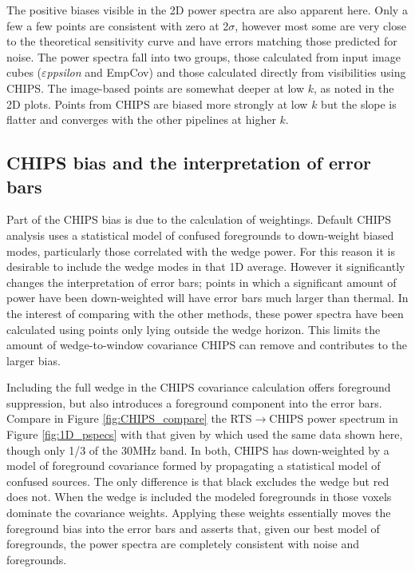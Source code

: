 \documentclass[twolcolumn,iop]{emulateapj}
\def\eppsilon{{\it $\varepsilon$ppsilon}}
\def\empirical{EmpCov}
\def\chipscite{\cite{2016arXiv160102073T}}
\begin{document}
The positive biases visible in the 2D power spectra are also apparent here. Only a few a few points  are consistent with zero at 2$\sigma$, however most some are very close to the theoretical sensitivity curve and have errors matching those predicted for noise.
 The power spectra fall into two groups, those calculated from input image cubes (\eppsilon{} and \empirical{}) and those calculated directly from visibilities using CHIPS. The image-based points are somewhat deeper at low $k$, as noted in the 2D plots.  Points from CHIPS are biased more strongly at low $k$ but the slope is flatter and converges with the other pipelines at higher $k$.  

\subsection{CHIPS bias and the interpretation of error bars}
Part of the CHIPS bias is due to the calculation of weightings. Default CHIPS analysis uses a statistical model of confused foregrounds to down-weight biased modes, particularly those correlated with the wedge power. For this reason it is desirable to include the wedge modes in that 1D average. However it significantly changes the interpretation of error bars; points in which a significant amount of power have been down-weighted will have error bars much larger than thermal. In the interest of comparing with the other methods, these power spectra have been calculated using points only lying outside the wedge horizon. This limits the amount of wedge-to-window covariance CHIPS can remove and contributes to the larger bias. 

Including the full wedge in the CHIPS covariance calculation offers foreground suppression, but also introduces a foreground component into the error bars. Compare in Figure \ref{fig:CHIPS_compare} the RTS$\to$CHIPS power spectrum in Figure \ref{fig:1D_pspecs} with that given by \chipscite{} which used the same data shown here, though only 1/3 of the 30MHz band.  In both, CHIPS has down-weighted by a model of foreground covariance formed by propagating a statistical model of confused sources. The only difference is that black excludes the wedge but red does not. When the wedge is included the modeled foregrounds in those voxels dominate the covariance weights. Applying these weights essentially moves the foreground bias into the error bars and asserts that, given our best model of foregrounds, the power spectra are completely consistent with noise and  foregrounds.
\end{document}
